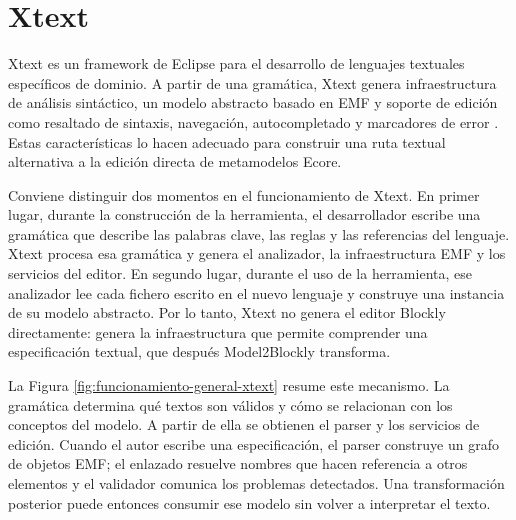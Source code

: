 \section{Xtext}
\label{sec:xtext}

Xtext es un framework de Eclipse para el desarrollo de lenguajes textuales
específicos de dominio. A partir de una gramática, Xtext genera infraestructura
de análisis sintáctico, un modelo abstracto basado en EMF y soporte de edición
como resaltado de sintaxis, navegación, autocompletado y marcadores de error
\cite{xtextProject,bettini2013xtext,bettini2015xsemantics}. Estas
características lo hacen adecuado para construir una ruta textual alternativa a
la edición directa de metamodelos Ecore.

Conviene distinguir dos momentos en el funcionamiento de Xtext. En primer
lugar, durante la construcción de la herramienta, el desarrollador escribe una
gramática que describe las palabras clave, las reglas y las referencias del
lenguaje. Xtext procesa esa gramática y genera el analizador, la infraestructura
EMF y los servicios del editor. En segundo lugar, durante el uso de la
herramienta, ese analizador lee cada fichero escrito en el nuevo lenguaje y
construye una instancia de su modelo abstracto. Por lo tanto, Xtext no genera el
editor Blockly directamente: genera la infraestructura que permite comprender
una especificación textual, que después Model2Blockly transforma.

La Figura \ref{fig:funcionamiento-general-xtext} resume este mecanismo. La
gramática determina qué textos son válidos y cómo se relacionan con los
conceptos del modelo. A partir de ella se obtienen el parser y los servicios de
edición. Cuando el autor escribe una especificación, el parser construye un
grafo de objetos EMF; el enlazado resuelve nombres que hacen referencia a otros
elementos y el validador comunica los problemas detectados. Una transformación
posterior puede entonces consumir ese modelo sin volver a interpretar el texto.

